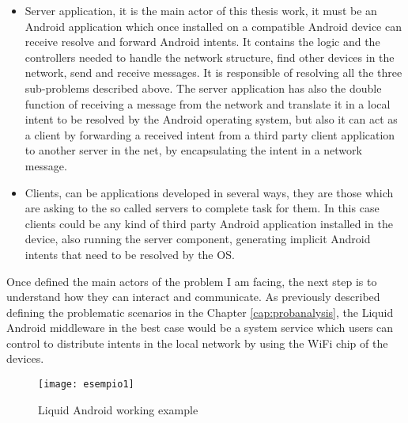 \begin{itemize}
	\item Server application, it is the main actor of this thesis work, it must be an Android application which once installed on a compatible Android device can receive resolve and forward Android intents. It contains the logic and the controllers needed to handle the network structure, find other devices in the network, send and receive messages. It is responsible of resolving all the three sub-problems described above. The server application has also the double function of receiving a message from the network and translate it in a local intent to be resolved by the Android operating system, but also it can act as a client by forwarding a received intent from a third party client application to another server in the net, by encapsulating the intent in a network message.
	\item Clients, can be applications developed in several ways, they are those which are asking to the so called servers to complete task for them. In this case clients could be any kind of third party Android application installed in the device, also running the server component, generating implicit Android intents that need to be resolved by the OS. 
\end{itemize}
Once defined the main actors of the problem I am facing, the next step is to understand how they can interact and communicate. As previously described defining the problematic scenarios in the Chapter \ref{cap:probanalysis}, the Liquid Android middleware in the best case would be a system service which users can control to distribute intents in the local network by using the WiFi chip of the devices.
\begin{figure}[h]
	\centering
	\texttt{[image: esempio1]}
	\caption{Liquid Android working example}
	\label{fig:4.2}
\end{figure}
